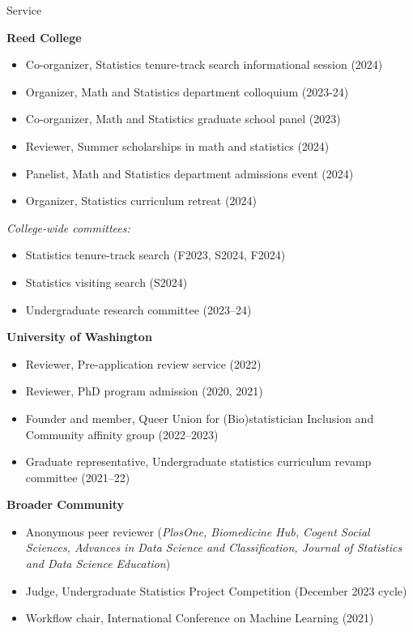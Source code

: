\documentclass{resume} %
\begin{document}
\begin{rSection}{Service}

\textbf{Reed College}
\begin{itemize}
\item Co-organizer, Statistics tenure-track search informational session (2024)
\item Organizer, Math and Statistics department colloquium (2023-24)
\item Co-organizer, Math and Statistics graduate school panel (2023)
\item Reviewer, Summer scholarships in math and statistics (2024)
\item Panelist, Math and Statistics department admissions event (2024)
\item Organizer, Statistics curriculum retreat (2024)
\end{itemize}

\textit{College-wide committees:}
\begin{itemize}
\item Statistics tenure-track search (F2023, S2024, F2024)
\item Statistics visiting search (S2024)
\item Undergraduate research committee (2023--24)
\end{itemize}

\textbf{University of Washington}
\begin{itemize}
\item Reviewer, Pre-application review service (2022)
\item Reviewer, PhD program admission (2020, 2021)
\item Founder and member, Queer Union for (Bio)statistician Inclusion and Community affinity group (2022--2023)
\item Graduate representative, Undergraduate statistics curriculum revamp committee (2021--22)
\end{itemize}

\textbf{Broader Community}
\begin{itemize}
\item Anonymous peer reviewer ({\it PlosOne, Biomedicine Hub, Cogent Social Sciences, Advances in Data Science and Classification, Journal of Statistics and Data Science Education})
\item Judge, Undergraduate Statistics Project Competition (December 2023 cycle)
\item Workflow chair, International Conference on Machine Learning (2021)
\end{itemize}




\end{rSection}
\end{document}
